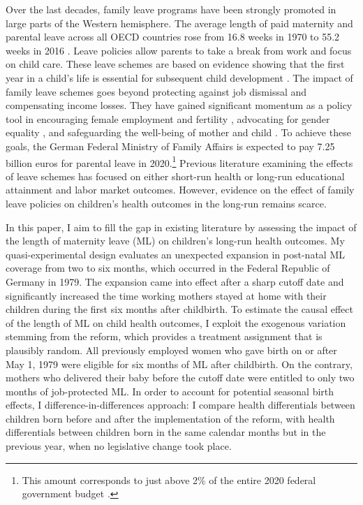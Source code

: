 

Over the last decades, family leave programs have been strongly promoted in large parts of the Western hemisphere. The average length of paid maternity and parental leave across all OECD countries rose from 16.8 weeks in 1970 to 55.2 weeks in 2016 \citep{oecd_data_leave}. Leave policies allow parents to take a break from work and focus on child care. These leave schemes are based on evidence showing that the first year in a child's life is essential for subsequent child development \citep{currie2011human}. The impact of family leave schemes goes beyond protecting against job dismissal and compensating income losses. They have gained significant momentum as a policy tool in encouraging female employment \citep{blau2013} and fertility \citep{RafaelLaliveandJosefZweimuller2009}, advocating for gender equality \citep{kotsadam2011state}, and safeguarding the well-being of mother and child \citep{butikofer2018impact}. To achieve these goals, the German Federal Ministry of Family Affairs is expected to pay 7.25 billion euros for parental leave in 2020.\footnote{This amount corresponds to just above 2\% of the entire 2020 federal government budget \citep{federal_budget}.} Previous literature examining the effects of leave schemes has focused on either short-run health or long-run educational attainment and labor market outcomes. However, evidence on the effect of family leave policies on children's health outcomes in the long-run remains scarce.


In this paper, I aim to fill the gap in existing literature by assessing the impact of the length of maternity leave (ML) on children’s long-run health outcomes. My quasi-experimental design evaluates an unexpected expansion in post-natal ML coverage from two to six months, which occurred in the Federal Republic of Germany in 1979. The expansion came into effect after a sharp cutoff date and significantly increased the time working mothers stayed at home with their children during the first six months after childbirth. To estimate the causal effect of the length of ML on child health outcomes, I exploit the exogenous variation stemming from the reform, which provides a treatment assignment that is plausibly random. All previously employed women who gave birth on or after May 1, 1979 were eligible for six months of ML after childbirth. On the contrary, mothers who delivered their baby before the cutoff date were entitled to only two months of job-protected ML. In order to account for potential seasonal birth effects, I  difference-in-differences approach: I compare health differentials between children born  before and after the implementation of the reform, with health differentials between children born in the same calendar months but in the previous year, when no legislative change took place.\label{rev_mlch: r1_rdd+did_intro}


